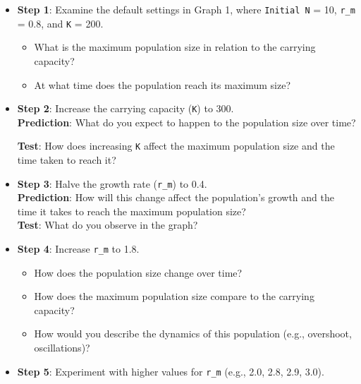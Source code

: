 \documentclass[
  a4paper]{book}
\begin{document}
\begin{itemize}
\item
  \textbf{Step 1}: Examine the default settings in Graph 1, where \texttt{Initial\ N} = 10, \texttt{r\_m} = 0.8, and \texttt{K} = 200.

  \begin{itemize}
  \item
    What is the maximum population size in relation to the carrying capacity?
  \item
    At what time does the population reach its maximum size?
  \end{itemize}
\item
  \textbf{Step 2}: Increase the carrying capacity (\texttt{K}) to 300.\\
  \textbf{Prediction}: What do you expect to happen to the population size over time?

  \textbf{Test}: How does increasing \texttt{K} affect the maximum population size and the time taken to reach it?
\item
  \textbf{Step 3}: Halve the growth rate (\texttt{r\_m}) to 0.4.\\
  \textbf{Prediction}: How will this change affect the population's growth and the time it takes to reach the maximum population size?\\

  \textbf{Test}: What do you observe in the graph?
\item
  \textbf{Step 4}: Increase \texttt{r\_m} to 1.8.

  \begin{itemize}
  \item
    How does the population size change over time?
  \item
    How does the maximum population size compare to the carrying capacity?
  \item
    How would you describe the dynamics of this population (e.g., overshoot, oscillations)?
  \end{itemize}
\item
  \textbf{Step 5}: Experiment with higher values for \texttt{r\_m} (e.g., 2.0, 2.8, 2.9, 3.0).


\end{itemize}
\end{document}
